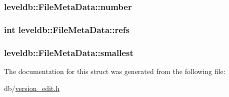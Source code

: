 \subsubsection[{number}]{ leveldb\+::\+File\+Meta\+Data\+::number}\label{structleveldb_1_1_file_meta_data_adc63bac3e06fd4387ebb9f085fc88fe7}
\hypertarget{structleveldb_1_1_file_meta_data_a199e4ba2167c8facad8bd41269982935}{}
\subsubsection[{refs}]{\setlength{\rightskip}{0pt plus 5cm}int leveldb\+::\+File\+Meta\+Data\+::refs}\label{structleveldb_1_1_file_meta_data_a199e4ba2167c8facad8bd41269982935}
\hypertarget{structleveldb_1_1_file_meta_data_a9e5e5c149495aede836ac637cd89269f}{}
\subsubsection[{smallest}]{ leveldb\+::\+File\+Meta\+Data\+::smallest}\label{structleveldb_1_1_file_meta_data_a9e5e5c149495aede836ac637cd89269f}


The documentation for this struct was generated from the following file\+:\begin{DoxyCompactItemize}
\item 
db/\hyperlink{version__edit_8h}{version\+\_\+edit.\+h}\end{DoxyCompactItemize}
